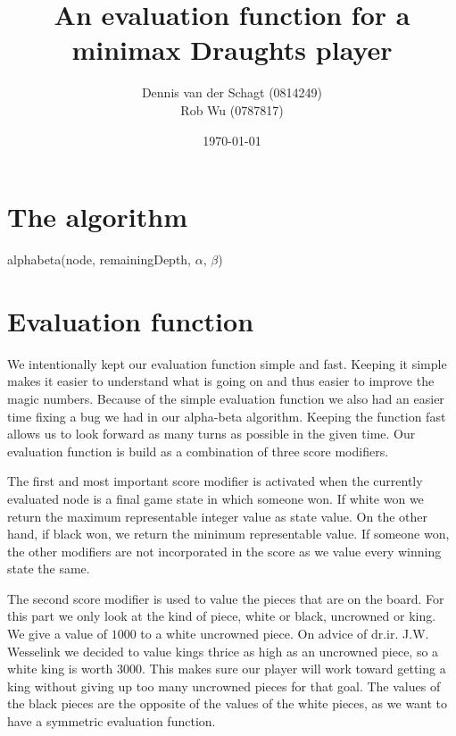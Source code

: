 \documentclass[11pt,a4paper]{article}
\title{An evaluation function for a minimax Draughts player}
\author{
Dennis van der Schagt (0814249)\\
Rob Wu (0787817)
}
\date{\today}
\begin{document}
\maketitle
\newpage
\section{The algorithm}

\begin{function}[H]
	\DontPrintSemicolon
	\caption{alphabeta(node, remainingDepth, $\alpha$, $\beta$)}
\end{function}

\section{Evaluation function}
We intentionally kept our evaluation function simple and fast. Keeping it simple makes it easier to understand what is going on and thus easier to improve the magic numbers. Because of the simple evaluation function we also had an easier time fixing a bug we had in our alpha-beta algorithm. Keeping the function fast allows us to look forward as many turns as possible in the given time. Our evaluation function is build as a combination of three score modifiers.

The first and most important score modifier is activated when the currently evaluated node is a final game state in which someone won. If white won we return the maximum representable integer value as state value. On the other hand, if black won, we return the minimum representable value. If someone won, the other modifiers are not incorporated in the score as we value every winning state the same.

The second score modifier is used to value the pieces that are on the board. For this part we only look at the kind of piece, white or black, uncrowned or king. We give a value of $1000$ to a white uncrowned piece. On advice of dr.ir. J.W. Wesselink we decided to value kings thrice as high as an uncrowned piece, so a white king is worth $3000$. This makes sure our player will work toward getting a king without giving up too many uncrowned pieces for that goal. The values of the black pieces are the opposite of the values of the white pieces, as we want to have a symmetric evaluation function.
\end{document}
